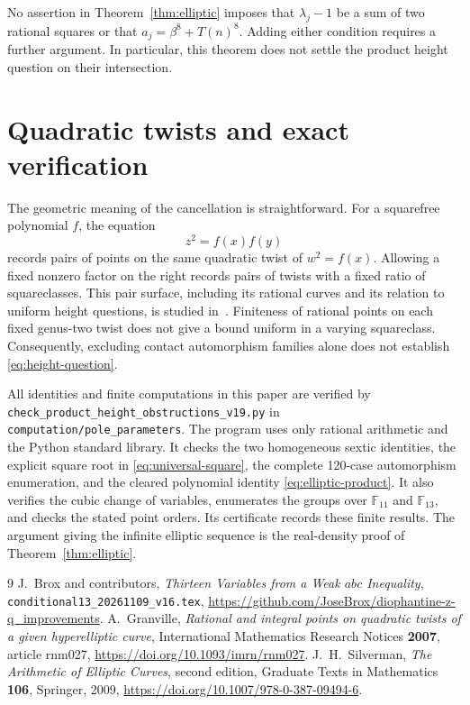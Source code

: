 \documentclass[11pt,a4paper]{article}
\begin{document}
No assertion in Theorem~\ref{thm:elliptic} imposes that
$\lambda_j-1$ be a sum of two rational squares or that
$a_j=\beta^8+T(n)^8$. Adding either condition requires a further
argument. In particular, this theorem does not settle the product
height question on their intersection.

\section{Quadratic twists and exact verification}

The geometric meaning of the cancellation is straightforward.
For a squarefree polynomial $f$, the equation
\[
                            z^2=f(x)f(y)
\]
records pairs of points on the same quadratic twist of
$w^2=f(x)$. Allowing a fixed nonzero factor on the right records
pairs of twists with a fixed ratio of squareclasses. This pair
surface, including its rational curves and its relation to uniform
height questions, is studied in~\cite[Sections~7--8]{Granville}.
Finiteness of rational points on each fixed genus-two twist does
not give a bound uniform in a varying squareclass. Consequently,
excluding contact automorphism families alone does not establish
\eqref{eq:height-question}.

All identities and finite computations in this paper are verified by
\nolinkurl{check_product_height_obstructions_v19.py} in
\nolinkurl{computation/pole_parameters}. The program uses only rational
arithmetic and the Python standard library. It checks the two
homogeneous sextic identities, the explicit square root in
\eqref{eq:universal-square}, the complete 120-case automorphism
enumeration, and the cleared polynomial identity
\eqref{eq:elliptic-product}. It also verifies the cubic change of
variables, enumerates the groups over $\mathbb F_{11}$ and
$\mathbb F_{13}$, and checks the stated point orders. Its certificate
records these finite results. The argument giving the infinite
elliptic sequence is the real-density proof of
Theorem~\ref{thm:elliptic}.

\begin{thebibliography}{9}\small
{}
J.~Brox and contributors, \emph{Thirteen Variables from a Weak $abc$
Inequality},
\texttt{conditional13\_20261109\_v16.tex},
\url{https://github.com/JoseBrox/diophantine-z-q_improvements}.
A.~Granville, \emph{Rational and integral points on quadratic twists
of a given hyperelliptic curve}, International Mathematics Research
Notices \textbf{2007}, article rnm027,
\url{https://doi.org/10.1093/imrn/rnm027}.
J.~H.~Silverman, \emph{The Arithmetic of Elliptic Curves}, second
edition, Graduate Texts in Mathematics \textbf{106}, Springer, 2009,
\url{https://doi.org/10.1007/978-0-387-09494-6}.
\end{thebibliography}
\end{document}
